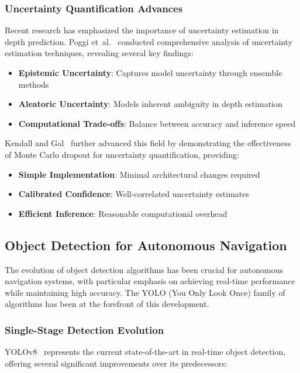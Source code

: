 \documentclass[12pt,oneside]{book}
\begin{document}
\subsubsection{Uncertainty Quantification Advances}
Recent research has emphasized the importance of uncertainty estimation in depth prediction. Poggi et~al.~\cite{poggi2020uncertainty} conducted comprehensive analysis of uncertainty estimation techniques, revealing several key findings:

\begin{itemize}
    \item \textbf{Epistemic Uncertainty}: Captures model uncertainty through ensemble methods
    \item \textbf{Aleatoric Uncertainty}: Models inherent ambiguity in depth estimation
    \item \textbf{Computational Trade-offs}: Balance between accuracy and inference speed
\end{itemize}

Kendall and Gal~\cite{kendall2017uncertainties} further advanced this field by demonstrating the effectiveness of Monte Carlo dropout for uncertainty quantification, providing:

\begin{itemize}
    \item \textbf{Simple Implementation}: Minimal architectural changes required
    \item \textbf{Calibrated Confidence}: Well-correlated uncertainty estimates
    \item \textbf{Efficient Inference}: Reasonable computational overhead
\end{itemize}

\subsection{Object Detection for Autonomous Navigation}

The evolution of object detection algorithms has been crucial for autonomous navigation systems, with particular emphasis on achieving real-time performance while maintaining high accuracy. The YOLO (You Only Look Once) family of algorithms has been at the forefront of this development.

\subsubsection{Single-Stage Detection Evolution}
YOLOv8~\cite{jocher2023ultralytics} represents the current state-of-the-art in real-time object detection, offering several significant improvements over its predecessors:
\end{document}
